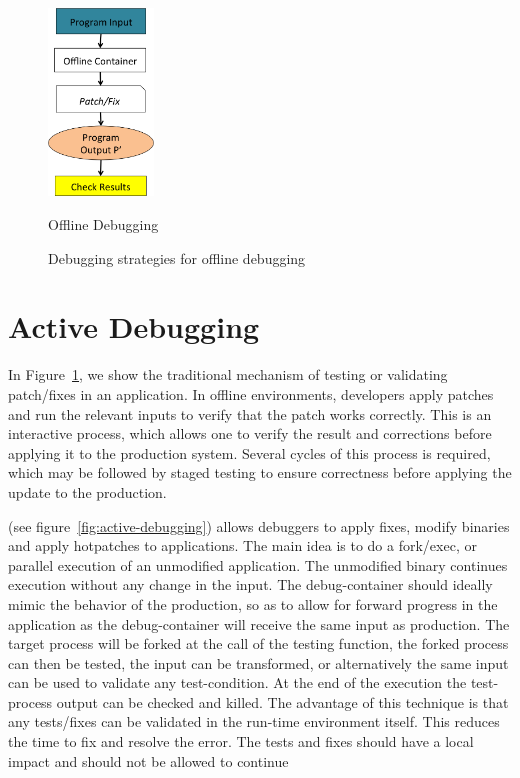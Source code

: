\begin{figure}[ht]
	\centering
	\includegraphics[width=0.25\textwidth]{guided/figs/offline.png}
	\caption{Offline Debugging}
	\label{fig:offline-debugging}
	\caption{Debugging strategies for offline debugging}
\end{figure}

\section{Active Debugging}
\label{sec:guided-approach}

In Figure~\ref{fig:offline-debugging}, we show the traditional mechanism of testing or validating patch/fixes in an application. 
In offline environments, developers apply patches and run the relevant inputs to verify that the patch works correctly. 
This is an interactive process, which allows one to verify the result and corrections before applying it to the production system.
Several cycles of this process is required, which may be followed by staged testing to ensure correctness before applying the update to the production.


\activedebugging (see figure~\ref{fig:active-debugging}) allows debuggers to apply fixes, modify binaries and apply hotpatches to applications. 
The main idea is to do a fork/exec, or parallel execution of an unmodified application.
The unmodified binary continues execution without any change in the input.
The debug-container should ideally mimic the behavior of the production, so as to allow for forward progress in the application as the debug-container will receive the same input as production.
The target process will be forked at the call of the testing function, the forked process can then be tested, the input can be transformed, or alternatively the same input can be used to validate any test-condition. 
At the end of the execution the test-process output can be checked and killed. 
The advantage of this technique is that any tests/fixes can be validated in the run-time environment itself.
This reduces the time to fix and resolve the error. 
The tests and fixes should have a local impact and should not be allowed to continue 


